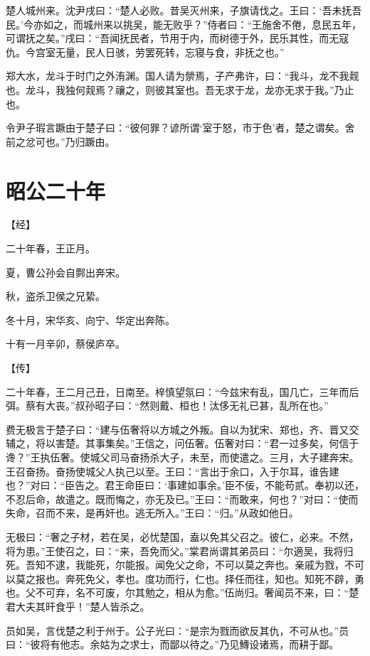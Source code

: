 \documentclass[a4paper,12pt,UTF8,twoside]{ctexbook}
\begin{document}
楚人城州来。沈尹戌曰：“楚人必败。昔吴灭州来，子旗请伐之。王曰：‘吾未抚吾民。’今亦如之，而城州来以挑吴，能无败乎？”侍者曰：“王施舍不倦，息民五年，可谓抚之矣。”戌曰：“吾闻抚民者，节用于内，而树德于外，民乐其性，而无寇仇。今宫室无量，民人日骇，劳罢死转，忘寝与食，非抚之也。”

郑大水，龙斗于时门之外洧渊。国人请为禜焉，子产弗许，曰：“我斗，龙不我觌也。龙斗，我独何觌焉？禳之，则彼其室也。吾无求于龙，龙亦无求于我。”乃止也。

令尹子瑕言蹶由于楚子曰：“彼何罪？谚所谓‘室于怒，市于色’者，楚之谓矣。舍前之忿可也。”乃归蹶由。


\chapter{昭公二十年}



【经】

二十年春，王正月。

夏，曹公孙会自鄸出奔宋。

秋，盗杀卫侯之兄絷。

冬十月，宋华亥、向宁、华定出奔陈。

十有一月辛卯，蔡侯庐卒。

【传】

二十年春，王二月己丑，日南至。梓慎望氛曰：“今兹宋有乱，国几亡，三年而后弭。蔡有大丧。”叔孙昭子曰：“然则戴、桓也！汰侈无礼已甚，乱所在也。”

费无极言于楚子曰：“建与伍奢将以方城之外叛。自以为犹宋、郑也，齐、晋又交辅之，将以害楚。其事集矣。”王信之，问伍奢。伍奢对曰：“君一过多矣，何信于谗？”王执伍奢。使城父司马奋扬杀大子，未至，而使遣之。三月，大子建奔宋。王召奋扬。奋扬使城父人执己以至。王曰：“言出于余口，入于尔耳，谁告建也？”对曰：“臣告之。君王命臣曰：‘事建如事余。’臣不佞，不能苟贰。奉初以还，不忍后命，故遣之。既而悔之，亦无及已。”王曰：“而敢来，何也？”对曰：“使而失命，召而不来，是再奸也。逃无所入。”王曰：“归。”从政如他日。

无极曰：“奢之子材，若在吴，必忧楚国，盍以免其父召之。彼仁，必来。不然，将为患。”王使召之，曰：“来，吾免而父。”棠君尚谓其弟员曰：“尔適吴，我将归死。吾知不逮，我能死，尔能报。闻免父之命，不可以莫之奔也。亲戚为戮，不可以莫之报也。奔死免父，孝也。度功而行，仁也。择任而往，知也。知死不辟，勇也。父不可弃，名不可废，尔其勉之，相从为愈。”伍尚归。奢闻员不来，曰：“楚君大夫其旰食乎！”楚人皆杀之。

员如吴，言伐楚之利于州于。公子光曰：“是宗为戮而欲反其仇，不可从也。”员曰：“彼将有他志。余姑为之求士，而鄙以待之。”乃见鱄设诸焉，而耕于鄙。
\end{document}
